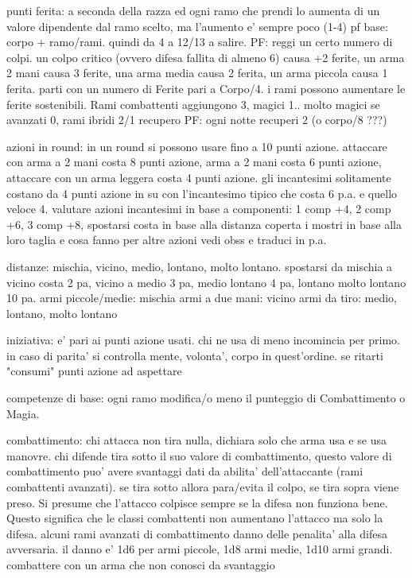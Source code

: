 \documentclass[12pt,a4paper,twoside,openany,twocolumn]{book}
\begin{document}
punti ferita: a seconda della razza ed ogni ramo che prendi lo aumenta di un valore dipendente dal ramo scelto, ma l'aumento e' sempre poco (1-4)
pf base: corpo + ramo/rami. quindi da 4 a 12/13 a salire. 
PF:  reggi un certo numero di colpi. un colpo critico (ovvero difesa fallita di almeno 6) causa +2 ferite, un arma 2 mani causa 3 ferite, una arma media causa 2 ferita, un arma piccola causa 1 ferita.
parti con un numero di Ferite pari a Corpo/4. i rami possono aumentare le ferite sostenibili. 
Rami combattenti aggiungono 3, magici 1.. molto magici se avanzati 0, rami ibridi 2/1
recupero PF: ogni notte recuperi 2 (o corpo/8 ???)

azioni in round: in un round si possono usare fino a 10 punti azione. attaccare con arma a 2 mani costa 8 punti azione, arma a 2 mani costa 6 punti azione, attaccare con un arma leggera costa 4 punti azione. gli incantesimi solitamente costano da 4 punti azione in su con l'incantesimo tipico che costa 6 p.a. e quello veloce 4. valutare azioni incantesimi in base a componenti: 1 comp +4, 2 comp +6, 3 comp +8, spostarsi costa in base alla distanza coperta
i mostri in base alla loro taglia e cosa fanno
per altre azioni vedi obss e traduci in p.a.

distanze: mischia, vicino, medio, lontano, molto lontano. spostarsi da mischia a vicino costa 2 pa, vicino a medio 3 pa, medio lontano 4 pa, lontano molto lontano 10 pa.
armi piccole/medie: mischia
armi a due mani: vicino
armi da tiro: medio, lontano, molto lontano

iniziativa: e' pari ai punti azione usati. chi ne usa di meno incomincia per primo. in caso di parita' si controlla mente, volonta', corpo in quest'ordine. se ritarti "consumi" punti azione ad aspettare

competenze di base: ogni ramo modifica/o meno il punteggio di Combattimento o Magia.

combattimento: chi attacca non tira nulla, dichiara solo che arma usa e se usa manovre. chi difende tira sotto il suo valore di combattimento, questo valore di combattimento puo' avere svantaggi dati da abilita' dell'attaccante (rami combattenti avanzati). se tira sotto allora para/evita il colpo, se tira sopra viene preso.
Si presume che l'attacco colpisce sempre se la difesa non funziona bene. Questo significa che le classi combattenti non aumentano l'attacco ma solo la difesa. alcuni rami avanzati di combattimento danno delle penalita' alla difesa avversaria.
il danno e' 1d6 per armi piccole, 1d8 armi medie, 1d10 armi grandi. 
combattere con un arma che non conosci da svantaggio
\end{document}
